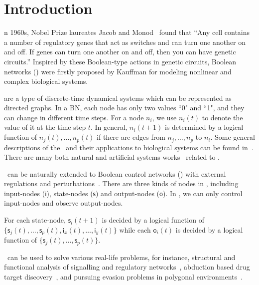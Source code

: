 

\section{Introduction}
\label{sec:intro}


n 1960s, Nobel Prize laureates Jacob and Monod~\cite{Jacob1961Genetic} found that ``Any cell contains a number of regulatory genes that act as switches and can turn one another on and off. If genes can turn one another on and off, then you can have genetic circuits.'' Inspired by these Boolean-type actions in genetic circuits, Boolean networks (\BNs) were firstly proposed by Kauffman \cite{Kauffman1968Metabolic} for modeling nonlinear and complex biological systems. 

{\BNs} are a type of discrete-time dynamical systems which can be represented as directed graphs. In a BN, each node has only two values ``0" and ``1", and they can change in different time steps.  For a node $n_i$, we use $n_i(t)$ to denote the value of it at the time step $t$.
In general, $n_i(t+1)$ is determined by a logical function of $n_j(t),\ldots,n_p(t)$ if  there are  edges from $n_j,\ldots,n_p$ to $n_i$.  
Some general descriptions of the \BNs\ and their applications to biological systems can be found in~\cite{Kauffman1968Metabolic}. There are many both natural and artificial systems works~\cite{Akutsu2000Inferring, Shmulevich2002From, Faur2006Dynamical,Green2007The,Lou2010Multi} related to \BNs.
 

\BNs\ can be naturally extended to Boolean control networks (\BCNs) with external regulations and perturbations~\cite{Ideker2001A}. There are three kinds of nodes in \BCNs, including input-nodes ($\mathsf{i}$), state-nodes ($\mathsf{s}$) and output-nodes ($\mathsf{o}$). In \BCNs, we can only control input-nodes and observe output-nodes. 

For each state-node, $\mathsf{s}_i(t+1)$ is decided by a logical function of  $\{\mathsf{s}_j(t),\ldots,\mathsf{s}_p(t),\mathsf{i}_x(t),\ldots,\mathsf{i}_y(t)\}$  %
while each $\mathsf{o}_i(t)$ is decided by a logical function of   $\{\mathsf{s}_j(t),\ldots,\mathsf{s}_p(t)\}$. 

\BCNs\ can be used to solve various real-life problems, for instance, 
structural and functional analysis of signalling and regulatory networks~\cite{Kaufman1999A, Klamt2006A}, 
abduction based drug target discovery~\cite{Biane2017Abduction}, 
and pursuing evasion problems in polygonal environments~\cite{Thunberg2011A}. 

